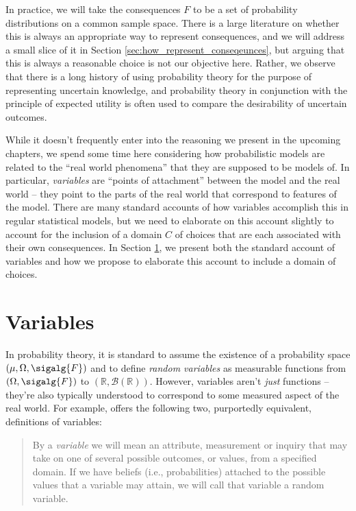 In practice, we will take the consequences $F$ to be a set of probability distributions on a common sample space. There is a large literature on whether this is always an appropriate way to represent consequences, and we will address a small slice of it in Section \ref{sec:how_represent_conseqeunces}, but arguing that this is always a reasonable choice is not our objective here. Rather, we observe that there is a long history of using probability theory for the purpose of representing uncertain knowledge, and probability theory in conjunction with the principle of expected utility is often used to compare the desirability of uncertain outcomes.

While it doesn't frequently enter into the reasoning we present in the upcoming chapters, we spend some time here considering how probabilistic models are related to the ``real world phenomena'' that they are supposed to be models of. In particular, \emph{variables} are ``points of attachment'' between the model and the real world -- they point to the parts of the real world that correspond to features of the model. There are many standard accounts of how variables accomplish this in regular statistical models, but we need to elaborate on this account slightly to account for the inclusion of a domain $C$ of choices that are each associated with their own consequences. In Section \ref{sec:variable}, we present both the standard account of variables and how we propose to elaborate this account to include a domain of choices.

\section{Variables}\label{sec:variable}

In probability theory, it is standard to assume the existence of a probability space $(\mu,\Omega,\sigalg{F})$ and to define \emph{random variables} as measurable functions from $(\Omega,\sigalg{F})$ to $(\mathbb{R},\mathcal{B}(\mathbb{R}))$. However, variables aren't \emph{just} functions -- they're also typically understood to correspond to some measured aspect of the real world. For example, \citet{pearl_causality:_2009} offers the following two, purportedly equivalent, definitions of variables:
\begin{quote}
By a \emph{variable} we will mean an attribute, measurement or inquiry that may take on one of several possible outcomes, or values, from a specified domain. If we have beliefs (i.e., probabilities) attached to the possible values that a variable may attain, we will call that variable a random variable.
\end{quote}

